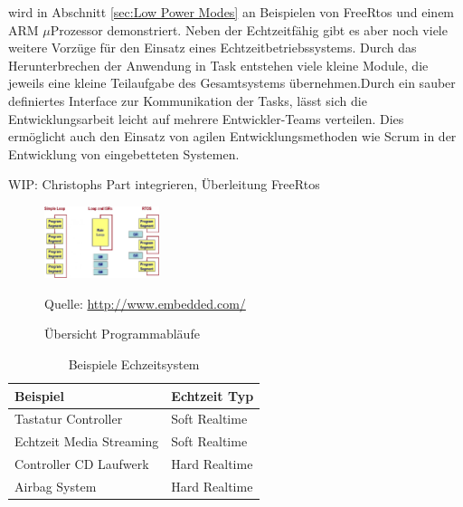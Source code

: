 \documentclass[ngerman]{seminarvorlage}
\newcommand*{\quelle}{%
  \footnotesize Quelle: 
}
\begin{document}
wird in Abschnitt \ref{sec:Low Power Modes} an Beispielen von FreeRtos und einem ARM $\mu$Prozessor demonstriert. Neben der Echtzeitfähig gibt es aber noch viele weitere Vorzüge für den Einsatz eines Echtzeitbetriebssystems.  
Durch das Herunterbrechen der Anwendung in Task entstehen viele kleine Module, die jeweils eine kleine Teilaufgabe des Gesamtsystems übernehmen.Durch ein sauber definiertes Interface zur Kommunikation der Tasks, lässt sich die Entwicklungsarbeit leicht auf mehrere Entwickler-Teams verteilen. Dies ermöglicht auch den Einsatz von agilen Entwicklungsmethoden wie Scrum in der Entwicklung von eingebetteten Systemen. 

WIP: Christophs Part integrieren, Überleitung FreeRtos  
\newline  
\begin{figure}
	\centering
		\includegraphics[width=0.3\textwidth]{Pictures/EmbeddedCom/cwrtos2f5c.jpg}
	\caption{Übersicht Programmabläufe}
	\quelle\url{http://www.embedded.com/}
	\label{fig:Programmablauf}
\end{figure}

\begin{table}
	\centering
		\begin{tabular}{|l|l|}
		\hline
			   Beispiel & Echtzeit Typ \\
				\hline
  Tastatur Controller & Soft Realtime \\
	\hline
  Echtzeit Media Streaming  & Soft Realtime \\
	\hline
	Controller CD Laufwerk  & Hard Realtime \\
	\hline
	Airbag System  & Hard Realtime\\
	\hline
		\end{tabular}
	\caption{Beispiele Echzeitsystem}
	\label{tab:BeispieleEchzeitsystem}
\end{table}
\end{document}
